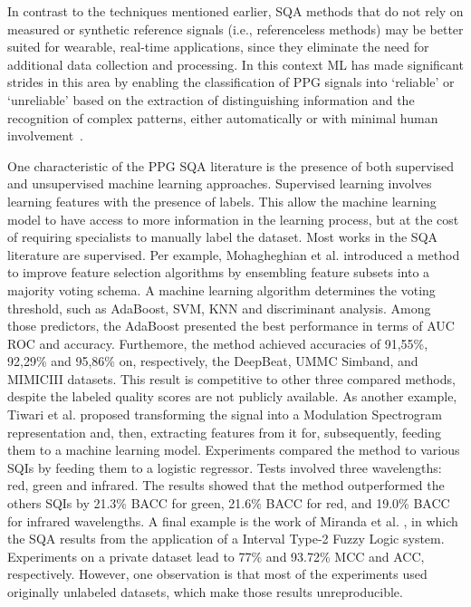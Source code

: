 In contrast to the techniques mentioned earlier, \gls{SQA} methods that do not rely on measured or synthetic reference signals (i.e., referenceless methods) may be better suited for wearable, real-time applications, since they eliminate the need for additional data collection and processing. In this context \gls{ML} has made significant strides in this area by enabling the classification of \gls{PPG} signals into `reliable' or `unreliable' based on the extraction of distinguishing information and the recognition of complex patterns, either automatically or with minimal human involvement~\cite{janiesch2021machine}. 


		
One characteristic of the \gls{PPG} \gls{SQA} literature is the presence of both supervised and unsupervised machine learning approaches. Supervised learning involves learning features with the presence of labels. This allow the machine learning model to have access to more information in the learning process, but at the cost of requiring specialists to manually label the dataset. Most works in the \gls{SQA} literature are supervised. Per example, Mohagheghian et al. \cite{ppg-sqa-1} introduced a method to improve feature selection algorithms by ensembling feature subsets into a majority voting schema. A machine learning algorithm determines the voting threshold, such as AdaBoost, \gls{SVM}, \gls{KNN} and discriminant analysis. Among those predictors, the AdaBoost presented the best performance in terms of \gls{AUC} \gls{ROC} and accuracy. Furthemore, the method achieved accuracies of 91,55\%, 92,29\% and 95,86\% on, respectively, the DeepBeat, UMMC Simband, and MIMICIII datasets. This result is competitive to other three compared methods, despite the labeled quality scores are not publicly available. As another example, Tiwari et al. \cite{ppg-sqa-2} proposed transforming the signal into a Modulation Spectrogram representation and, then, extracting features from it for, subsequently, feeding them to a machine learning model. Experiments compared the method to various \glspl{SQI} by feeding them to a logistic regressor. Tests involved three wavelengths: red, green and infrared. The results showed that the method outperformed the others \glspl{SQI} by 21.3\% \gls{BACC} for green, 21.6\% \gls{BACC} for red, and 19.0\% \gls{BACC} for infrared wavelengths. A final example is the work of Miranda et al. \cite{ppg-sqa-3}, in which the \gls{SQA} results from the application of a Interval Type-2 Fuzzy Logic system. Experiments on a private dataset lead to 77\% and 93.72\% \gls{MCC} and \gls{ACC}, respectively. However, one observation is that most of the experiments used originally unlabeled datasets, which make those results unreproducible. 
	
